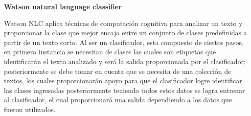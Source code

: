 \begin{large}
	 \textbf{Watson natural language classifier}\\
\end{large}

Watson NLC \cite{diez} aplica técnicas de computación cognitiva para analizar un texto y proporcionar la clase que mejor encaja entre un conjunto de clases predefinidas a partir de un texto corto.
Al ser un clasificador, esta compuesto de ciertos pasos, en primera instancia se necesitan de clases las cuales son etiquetas que identificarán el texto analizado y será la salida proporcionada por el clasificador; posteriormente se debe tomar en cuenta que se necesita de una colección de textos, los cuales proporcionarán apoyo para que el clasificador logre identificar las clases ingresadas posteriormente teniendo todos estos datos se logra entrenar al clasificador, el cual proporcionará una salida dependiendo a los datos que fueron utilizados.


